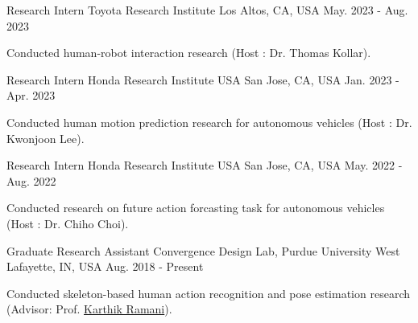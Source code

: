 


\begin{cventries}

\cventry
{Research Intern} %
{Toyota Research Institute} %
{Los Altos, CA, USA} %
{May. 2023 - Aug. 2023} %
{ %
\begin{cvitems}
\item {Conducted human-robot interaction research (Host : Dr. Thomas Kollar).}
\end{cvitems}
}
\vspace{-.5em}


\cventry
{Research Intern} %
{Honda Research Institute USA} %
{San Jose, CA, USA} %
{Jan. 2023 - Apr. 2023} %
{ %
\begin{cvitems}
\item {Conducted human motion prediction research for autonomous vehicles (Host : Dr. Kwonjoon Lee).}
\end{cvitems}
}
\vspace{-.5em}

\cventry
{Research Intern} %
{Honda Research Institute USA} %
{San Jose, CA, USA} %
{May. 2022 - Aug. 2022} %
{ %
\begin{cvitems}
\item {Conducted research on future action forcasting task for autonomous vehicles (Host : Dr. Chiho Choi).}
\end{cvitems}
}
\vspace{-.5em}

\cventry
{Graduate Research Assistant} %
{Convergence Design Lab, Purdue University} %
{West Lafayette, IN, USA} %
{Aug. 2018 - Present} %
{ %
\begin{cvitems}
\item {Conducted skeleton-based human action recognition and pose estimation research (Advisor: Prof. \href{https://engineering.purdue.edu/~ramani/wordpress/about/}{Karthik Ramani}).}
\end{cvitems}
}
\vspace{-.5em}


\end{cventries}
